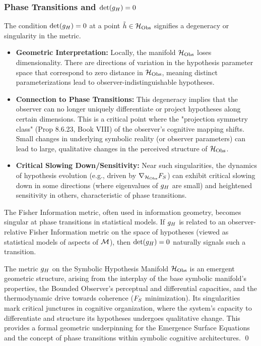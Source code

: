 \subsubsection{Phase Transitions and \(\det(g_H) = 0\)}
\label{subsec:bk8_phase_transitions}
The condition \(\det(g_H) = 0\) at a point \(\tilde{h} \in \mathcal{H}_{\mathrm{Obs}}\) signifies a degeneracy or singularity in the metric.
\begin{itemize}
    \item \textbf{Geometric Interpretation:} Locally, the manifold \(\mathcal{H}_{\mathrm{Obs}}\) loses dimensionality. There are directions of variation in the hypothesis parameter space that correspond to zero distance in \(\mathcal{H}_{\mathrm{Obs}}\), meaning distinct parameterizations lead to observer-indistinguishable hypotheses.
    \item \textbf{Connection to Phase Transitions:} This degeneracy implies that the observer can no longer uniquely differentiate or project hypotheses along certain dimensions. This is a critical point where the "projection symmetry class" (Prop 8.6.23, Book VIII) of the observer's cognitive mapping shifts. Small changes in underlying symbolic reality (or observer parameters) can lead to large, qualitative changes in the perceived structure of \(\mathcal{H}_{\mathrm{Obs}}\).
    \item \textbf{Critical Slowing Down/Sensitivity:} Near such singularities, the dynamics of hypothesis evolution (e.g., driven by \(\nabla_{\mathcal{H}_{\mathrm{Obs}}}F_S\)) can exhibit critical slowing down in some directions (where eigenvalues of \(g_H\) are small) and heightened sensitivity in others, characteristic of phase transitions.
\end{itemize}
The Fisher Information metric, often used in information geometry, becomes singular at phase transitions in statistical models. If \(g_H\) is related to an observer-relative Fisher Information metric on the space of hypotheses (viewed as statistical models of aspects of \(\mathcal{M}\)), then \(\det(g_H)=0\) naturally signals such a transition.
\begin{scholium}
\label{scholium:bk8_emergent_geometry_of_cognition}
The metric \(g_H\) on the Symbolic Hypothesis Manifold \(\mathcal{H}_{\mathrm{Obs}}\) is an emergent geometric structure, arising from the interplay of the base symbolic manifold's properties, the Bounded Observer's perceptual and differential capacities, and the thermodynamic drive towards coherence (\(F_S\) minimization). Its singularities mark critical junctures in cognitive organization, where the system's capacity to differentiate and structure its hypotheses undergoes qualitative change. This provides a formal geometric underpinning for the Emergence Surface Equations and the concept of phase transitions within symbolic cognitive architectures.
\qed
\end{scholium}